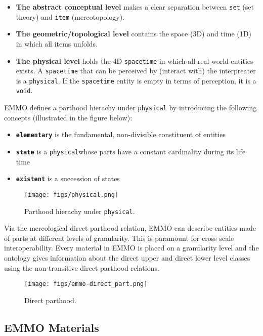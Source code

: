\documentclass[a4paper,]{report}
\begin{document}
\begin{itemize}
\item
  \textbf{The abstract conceptual level} makes a clear separation
  between \texttt{set} (set theory) and \texttt{item} (mereotopology).
\item
  \textbf{The geometric/topological level} contains the space (3D) and
  time (1D) in which all items unfolds.
\item
  \textbf{The physical level} holds the 4D \texttt{spacetime} in which
  all real world entities exists. A \texttt{spacetime} that can be
  perceived by (interact with) the interpreater is a \texttt{physical}.
  If the \texttt{spacetime} entity is empty in terms of perception, it
  is a \texttt{void}.
\end{itemize}

EMMO defines a parthood hierachy under \texttt{physical} by introducing
the following concepts (illustrated in the figure below):

\begin{itemize}
\item
  \textbf{\texttt{elementary}} is the fundamental, non-divisible
  constituent of entities
\item
  \textbf{\texttt{state}} is a \texttt{physical}whose parts have a
  constant cardinality during its life time
\item
  \textbf{\texttt{existent}} is a succession of states
\end{itemize}

\begin{figure}
\centering
\texttt{[image: figs/physical.png]}
\caption{Parthood hierachy under \texttt{physical}.}
\end{figure}

Via the mereological direct parthood relation, EMMO can describe
entities made of parts at different levels of granularity. This is
paramount for cross scale interoperability. Every material in EMMO is
placed on a granularity level and the ontology gives information about
the direct upper and direct lower level classes using the non-transitive
direct parthood relations.

\begin{figure}
\centering
\texttt{[image: figs/emmo-direct\_part.png]}
\caption{Direct parthood.}
\end{figure}

\hypertarget{emmo-materials}{%
\subsection{EMMO Materials}\label{emmo-materials}}
\end{document}
